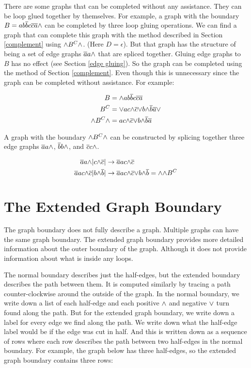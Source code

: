 \documentclass[acmtog]{acmart}
\begin{document}
There are some graphs that can be completed without any assistance. They can be
loop glued together by themselves. For example, a graph with the boundary
$B = ab\overline{b}c\overline{c}\overline{a} {\wedge}$ can be completed by three loop gluing
operations. We can find a graph that can complete this graph with the
method described in Section \ref{complement} using ${\wedge} B^C {\wedge}$.
(Here $D = \epsilon$). But that graph has the structure of being a set of
edge graphs $\overline{a}{a} {\wedge}$ that are spliced together. Gluing edge graphs to $B$
has no effect (see Section \ref{edge gluing}). So the graph can be completed
using the method of Section \ref{complement}. Even though this is unnecessary
since the graph can be completed without assistance. For example:

\begin{equation}
\begin{split}
B   & = {\wedge} ab\overline{b}c\overline{c}\overline{a} \\
B^C & = {\vee} ac {\wedge} \overline{c} {\vee} b {\wedge} \overline{b} \overline{a} {\vee} \\
{\wedge} B^C {\wedge} & = ac {\wedge} \overline{c} {\vee} b {\wedge} \overline{b} \overline{a}
\end{split}
\end{equation}

A graph with the boundary ${\wedge} B^C {\wedge}$ can be constructed by splicing together
three edge graphs $\overline{a}{a} {\wedge}$, $\overline{b}{b} {\wedge}$, and $\overline{c}{c} {\wedge}$.

\begin{equation}
\begin{split}
\overline{a}a {\wedge} | c {\wedge} \overline{c} | & \rightarrow \overline{a}a c {\wedge} \overline{c} \\
\overline{a}a c {\wedge} \overline{c} | b {\wedge} \overline{b} | & \rightarrow \overline{a}ac {\wedge} \overline{c} {\vee} b {\wedge} \overline{b} = {\wedge} {\wedge} B^C \\
\end{split}
\end{equation}

\section{The Extended Graph Boundary}

The graph boundary does not fully describe a graph. Multiple graphs can have the
same graph boundary. The extended graph boundary provides more detailed
information about the outer boundary of the graph. Although it does not provide
information about what is inside any loops.

The normal boundary describes just the half-edges, but the extended boundary 
describes the path between them. It is computed similarly by tracing a path 
counter-clockwise around the outside of the graph. In the normal boundary, we 
write down a list of each half-edge and each positive ${\wedge}$ and negative ${\vee}$
turn found along the path. But for the extended graph boundary, we write down 
a label for every edge we find along the path. We write down what the half-edge
label would be if the edge was cut in half. And this is written down as a 
sequence of rows where each row describes the path between two half-edges in the
normal boundary. For example, the graph below has three half-edges, so the
extended graph boundary contains three rows:
\end{document}
